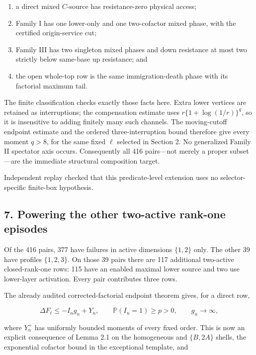 \begin{enumerate}
\def\labelenumi{\arabic{enumi}.}
\tightlist
\item
  a direct mixed \(C\)-source has resistance-zero physical access;
\item
  Family I has one lower-only and one two-cofactor mixed phase, with the
  certified origin-service cut;
\item
  Family III has two singleton mixed phases and down resistance at most
  two strictly below same-base up resistance; and
\item
  the open whole-top row is the same immigration-death phase with its
  factorial maximum tail.
\end{enumerate}

The finite classification checks exactly those facts here. Extra lower
vertices are retained as interruptions; the compensation estimate uses
\(r\{1+\log(1/r)\}^q\), so it is insensitive to adding finitely many
such channels. The moving-cutoff endpoint estimate and the ordered
three-interruption bound therefore give every moment \(q>8\), for the
same fixed \(\ell\) selected in Section 2. No generalized Family II
spectator axis occurs. Consequently all 416 pairs---not merely a proper
subset---are the immediate structural composition target.

Independent replay checked that this predicate-level extension uses no
selector-specific finite-box hypothesis.

\subsection{7. Powering the other two-active rank-one
episodes}

Of the 416 pairs, 377 have failures in active dimensions \(\{1,2\}\)
only. The other 39 have profiles \(\{1,2,3\}\). On those 39 pairs there
are 117 additional two-active closed-rank-one rows: 115 have an enabled
maximal lower source and two use lower-layer activation. Every pair
contributes three rows.

The already audited corrected-factorial endpoint theorem gives, for a
direct row,

\[
 \Delta F_\ell\le-I_ng_n+Y_n,
 \qquad \mathbb P(I_n=1)\ge p>0,
 \qquad g_n\to\infty,                                \tag{7.1}
\]

where \(Y_n^+\) has uniformly bounded moments of every fixed order. This
is now an explicit consequence of Lemma 2.1 on the homogeneous and
\(\{B,2A\}\) shells, the exponential cofactor bound in the exceptional
template, and

